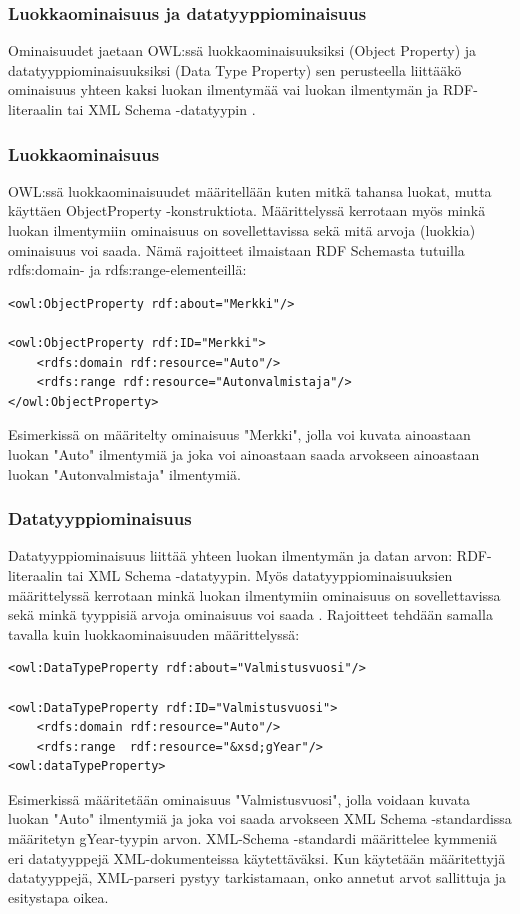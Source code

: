 \documentclass[finnish]{tktltiki2}
\theoremstyle{definition}
\theoremstyle{remark}
\begin{document}
\subsubsection{Luokkaominaisuus ja datatyyppiominaisuus}
Ominaisuudet jaetaan OWL:ssä luokkaominaisuuksiksi (Object Property) ja datatyyppiominaisuuksiksi (Data Type Property) sen perusteella liittääkö ominaisuus yhteen kaksi luokan ilmentymää vai luokan ilmentymän ja RDF-literaalin tai XML Schema -datatyypin  \cite{SWM04}. 
\subsubsection{Luokkaominaisuus}
OWL:ssä luokkaominaisuudet määritellään kuten mitkä tahansa luokat, mutta käyttäen ObjectProperty -konstruktiota. Määrittelyssä kerrotaan myös minkä luokan ilmentymiin ominaisuus on sovellettavissa sekä mitä arvoja (luokkia) ominaisuus voi saada. Nämä rajoitteet ilmaistaan RDF Schemasta tutuilla rdfs:domain- ja rdfs:range-elementeillä:
\begin{verbatim}
<owl:ObjectProperty rdf:about="Merkki"/>

<owl:ObjectProperty rdf:ID="Merkki">
    <rdfs:domain rdf:resource="Auto"/>
    <rdfs:range rdf:resource="Autonvalmistaja"/>
</owl:ObjectProperty>
\end{verbatim}
Esimerkissä on määritelty ominaisuus "Merkki", jolla voi kuvata ainoastaan luokan "Auto" ilmentymiä ja joka voi ainoastaan saada arvokseen ainoastaan luokan "Autonvalmistaja" ilmentymiä. 

\subsubsection{Datatyyppiominaisuus}
Datatyyppiominaisuus liittää yhteen luokan ilmentymän ja datan arvon: RDF-literaalin tai XML Schema -datatyypin. Myös datatyyppiominaisuuksien määrittelyssä kerrotaan minkä luokan ilmentymiin ominaisuus on sovellettavissa sekä minkä tyyppisiä arvoja ominaisuus voi saada \cite{SWM04}. Rajoitteet tehdään samalla tavalla kuin luokkaominaisuuden määrittelyssä:
\begin{verbatim}
<owl:DataTypeProperty rdf:about="Valmistusvuosi"/>

<owl:DataTypeProperty rdf:ID="Valmistusvuosi">
    <rdfs:domain rdf:resource="Auto"/>
    <rdfs:range  rdf:resource="&xsd;gYear"/>   
<owl:dataTypeProperty>
\end{verbatim}
Esimerkissä määritetään ominaisuus "Valmistusvuosi", jolla voidaan kuvata luokan "Auto" ilmentymiä ja joka voi saada arvokseen XML Schema -standardissa määritetyn gYear-tyypin arvon. XML-Schema -standardi määrittelee kymmeniä eri datatyyppejä XML-dokumenteissa käytettäväksi. Kun käytetään määritettyjä datatyyppejä, XML-parseri pystyy tarkistamaan, onko annetut arvot sallittuja ja esitystapa oikea.  
\end{document}

